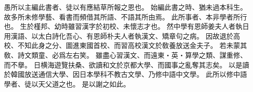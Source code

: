 愚所以主編此書者、徒以有應結草所報之恩也。
始編此書之時、猶未過本科生。
故多所未修學藝、看書而頻借其所語、不語其所由焉。
此所事者、本非學者所行也。
生於槿邦、幼時雖習漢字於初校、未懷志才也。
然中學有恩師姜夫人者執日用漢語、以太白詩化吾心、有恩師朴夫人者執漢文、矯章句之病。
因故退於高校、不知此身之分、圖進東國首校、而習高校漢文於敎養放送金夫子。
若未蒙其敎、詩文類童、必爲左右笑。
雖盡心習漢文、而遠東・英・算學之類、謀重修、而不擧。
日横海遊覽扶桑、欲讀和文於京都大學、而國事之亂奪其志矣。
以是讀於韓國放送通信大學、因日本學科不教古文學、乃修中語中文學。
此所以修中語學者、徒以天父道之也。
是以謝之如此。
